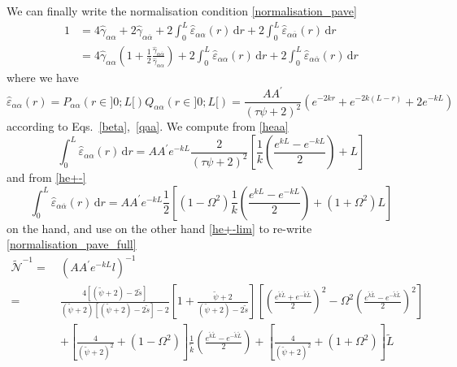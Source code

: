 \documentclass[pre,aps,superscriptaddress,nofootinbib]{revtex4}
\begin{document}
We can finally write the normalisation condition \eqref{normalisation_pave}
\begin{equation}
\begin{aligned}
1 &= 4 \hat{\gamma}_{\alpha\alpha} + 2 \hat{\gamma}_{\alpha\overline{\alpha}} + 2 \int_0^L \hat{\varepsilon}_{\alpha\alpha}(r) \, \mathrm{d}r + 2 \int_0^L \hat{\varepsilon}_{\alpha\overline{\alpha}}(r) \, \mathrm{d}r\\
&= 4 \hat{\gamma}_{\alpha\alpha} \left(1 + \frac{1}{2} \frac{\hat{\gamma}_{\alpha\overline{\alpha}}}{\hat{\gamma}_{\alpha\alpha}}\right) + 2 \int_0^L \hat{\varepsilon}_{\alpha\alpha}(r) \, \mathrm{d}r + 2 \int_0^L \hat{\varepsilon}_{\alpha\overline{\alpha}}(r) \, \mathrm{d}r
\label{normalisation_pave_full}
\end{aligned}
\end{equation}
where we have
\begin{equation}
\hat{\varepsilon}_{\alpha\alpha}(r) = P_{\alpha\alpha}(r \in ]0; L[) Q_{\alpha\alpha}(r \in ]0; L[) = \frac{A A^{\prime}}{(\tau \psi + 2)^2} \left(e^{-2 k r} + e^{-2 k (L - r)} + 2 e^{-k L}\right)
\label{heaa}
\end{equation}
according to Eqs.~\ref{beta},~\ref{qaa}. We compute from \eqref{heaa}
\begin{equation}
\int_0^L \hat{\varepsilon}_{\alpha\alpha}(r) \, \mathrm{d}r = A A^{\prime} e^{-k L} \frac{2}{(\tau \psi + 2)^2} \left[\frac{1}{k} \left(\frac{e^{k L} - e^{-k L}}{2}\right) + L\right]
\label{int_heaa}
\end{equation}
and from \eqref{he+-}
\begin{equation}
\int_0^L \hat{\varepsilon}_{\alpha\overline{\alpha}}(r) \, \mathrm{d}r = A A^{\prime} e^{-k L} \frac{1}{2} \left[\left(1 -\Omega^2\right) \frac{1}{k} \left(\frac{e^{k L} - e^{-k L}}{2}\right) + \left(1 + \Omega^2\right) L\right]
\end{equation}
on the hand, and use on the other hand \eqref{he+-lim} to re-write \eqref{normalisation_pave_full}
\begin{equation}
\begin{aligned}
\tilde{\mathcal{N}}^{-1} =~& (A A^{\prime} e^{-k L} l)^{-1}\\
=~& \frac{4 [(\tilde{\psi} + 2) - 2 \tilde{s}]}{(\tilde{\psi} + 2)[(\tilde{\psi} + 2) - 2 \tilde{s}] - 2} \left[1 + \frac{\tilde{\psi} + 2}{(\tilde{\psi} + 2) - 2 \tilde{s}}\right] \left[\left(\frac{e^{\tilde{k} \tilde{L}} + e^{-\tilde{k} \tilde{L}}}{2}\right)^2 - \Omega^2 \left(\frac{e^{\tilde{k} \tilde{L}} - e^{-\tilde{k} \tilde{L}}}{2}\right)^2\right]\\
&+ \left[\frac{4}{(\tilde{\psi} + 2)^2} + (1 - \Omega^2)\right] \frac{1}{\tilde{k}} \left(\frac{e^{\tilde{k} \tilde{L}} - e^{-\tilde{k} \tilde{L}}}{2}\right) + \left[\frac{4}{(\tilde{\psi} + 2)^2} + (1 + \Omega^2)\right] \tilde{L}
\end{aligned}
\label{normalisation_factor_pave}
\end{equation}
\end{document}
